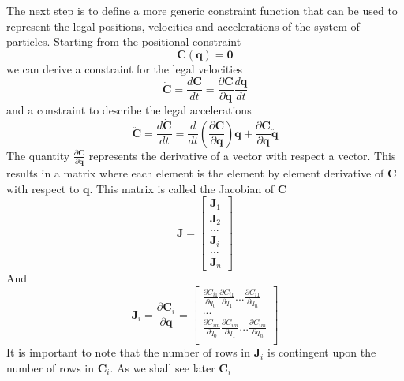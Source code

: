 The next step is to define a more generic constraint function that can be used
to represent the legal positions, velocities and accelerations of the system of
particles. Starting from the positional constraint
\begin{equation}
    \label{constrpos}
    \mathbf{C}(\mathbf{q}) = \mathbf{0}
\end{equation}
we can derive a constraint for the legal velocities 
\[
    \mathbf{\dot{C}} = \frac{d\mathbf{C}}{dt} = \frac{\partial\mathbf{C}}{\partial\mathbf{q}}
        \frac{d\mathbf{q}}{dt}
\]
and a constraint to describe the legal accelerations
\[
    \mathbf{\ddot{C}} = \frac{d\mathbf{\dot{C}}}{dt} = \frac{d}{dt}\left(
        \frac{\partial\mathbf{C}}{\partial\mathbf{q}}\right)\mathbf{\dot{q}} +
        \frac{\partial\mathbf{C}}{\partial\mathbf{q}}\mathbf{\ddot{q}}
\]
The quantity $\frac{\partial\mathbf{C}}{\partial\mathbf{q}}$ represents the
derivative of a vector with respect a vector. This results in a matrix where
each element is the element by element derivative of $\mathbf{C}$ with respect
to $\mathbf{q}$. This matrix is called the Jacobian of $\mathbf{C}$
\begin{equation}
    \label{Eqn:Jacobian1}
    \mathbf{J}=
    \begin{bmatrix}
        \mathbf{J}_1\\
        \mathbf{J}_2\\
        ...\\
        \mathbf{J}_i\\
        ...\\
        \mathbf{J}_n
    \end{bmatrix}
\end{equation}
And 
\begin{equation}
    \label{Eqn:Jacobian2}
    \mathbf{J}_i = 
    \frac{\partial \mathbf{C}_i}{\partial \mathbf{q}} = 
    \begin{bmatrix}
        \frac{\partial C_{i1}}{\partial q_0} \frac{\partial C_{i1}}{\partial
        q_1} ... \frac{\partial C_{i1}}{\partial q_n}\\
        ...\\    
        \frac{\partial C_{im}}{\partial q_0} \frac{\partial C_{im}}{\partial
        q_1} ... \frac{\partial C_{im}}{\partial q_n}\\
    \end{bmatrix}
\end{equation}
It is important to note that the number of rows in $\mathbf{J}_i$ is contingent
upon the number of rows in $\mathbf{C}_i$. As we shall see later $\mathbf{C}_i$

